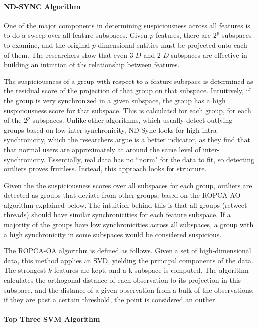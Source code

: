 \documentclass[11pt, oneside]{article}   	%
\begin{document}
\paragraph*{ND-SYNC Algorithm}
\quad

\quad One of the major components in determining suspiciousness across all features is to do a sweep over all feature subspaces.
Given $p$ features, there are $2^p$ subspaces to examine, and the original $p$-dimensional entities must be projected onto each of them.
The researchers show that even 3-$D$ and 2-$D$ subspaces are effective in building an intuition of the relationship between features.

\quad The suspiciousness of a group with respect to a feature subspace is determined as the residual score of the projection of that group on that subspace.
Intuitively, if the group is very synchronized in a given subspace, the group has a high suspiciousness score for that subspace.
This is calculated for each group, for each of the $2^p$ subspaces.
Unlike other algorithms, which usually detect outlying groups based on low inter-synchronicity, ND-Sync \cite{ndsync} looks for high intra-synchronicity, which the researchers argue is a better indicator, as they find that that normal users are approximately at around the same level of inter-synchronicity.
Essentially, real data has no ``norm" for the data to fit, so detecting outliers proves fruitless.
Instead, this approach looks for structure.

\quad Given the the suspiciousness scores over all subspaces for each group, outliers are detected as groups that deviate from other groups, based on the ROPCA-AO algorithm explained below.
The intuition behind this is that all groups (retweet threads) should have similar synchronicities for each feature subspace.
If a majority of the groups have low synchronicities across all subspaces, a group with a high synchronicity in some subspaces would be considered suspicious.

\quad The ROPCA-OA algorithm is defined as follows.
Given a set of high-dimensional data, this method applies an SVD, yielding the principal components of the data.
The strongest $k$ features are kept, and a k-subspace is computed.
The algorithm calculates the orthogonal distance of each observation to its projection in this subspace, and the distance of a given observation from a bulk of the observations; if they are past a certain threshold, the point is considered an outlier.

\paragraph{Top Three SVM Algorithm}
\end{document}
